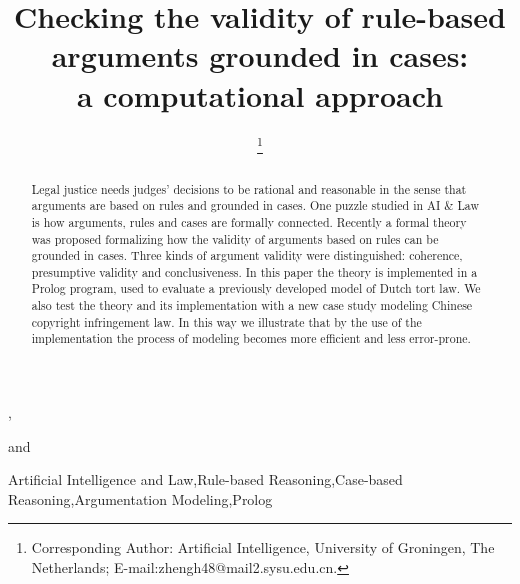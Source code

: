 \documentclass{IOS-Book-Article}
\begin{document}
\pagestyle{headings}
\def\thepage{}

\begin{frontmatter} 

\title{Checking the validity of rule-based arguments grounded in cases: \\a computational approach}


\author[A]{ \thanks{Corresponding Author: Artificial Intelligence, University of Groningen, The Netherlands; E-mail:zhengh48@mail2.sysu.edu.cn.}}, \author[B]{ } and \author[A]{ }

\address[A]{Artificial Intelligence, University of Groningen, The Netherlands}
\address[B]{Institute of Logic and Cognition, Sun Yat-sen University, Guangzhou, China}

\begin{abstract}
Legal justice needs judges' decisions to be rational and reasonable in the sense that arguments are based on rules and grounded in cases.  One puzzle studied in AI \& Law is how arguments, rules and cases are formally connected. Recently a formal theory was proposed formalizing how the validity of arguments based on rules can be grounded in cases. Three kinds of argument validity were distinguished: coherence, presumptive validity and conclusiveness. In this paper the theory is implemented in a Prolog program, used to evaluate a previously developed model of Dutch tort law. We also test the theory and its implementation with a new case study modeling Chinese copyright infringement law. In this way we illustrate that by the use of the implementation the process of modeling becomes more efficient and less error-prone.
\end{abstract}

\begin{keyword}
Artificial Intelligence and Law\sep Rule-based Reasoning\sep Case-based Reasoning\sep Argumentation Modeling\sep Prolog
\end{keyword}
\end{frontmatter}
\end{document}
